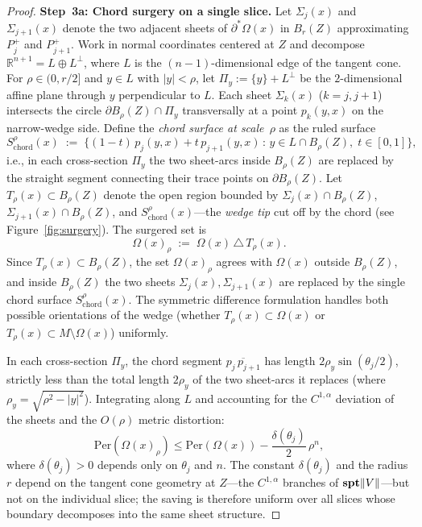 \begin{proof}
\noindent\textbf{Step~3a: Chord surgery on a single slice.}
Let $\Sigma_j(x)$ and $\Sigma_{j+1}(x)$ denote the two adjacent sheets of $\partial^*\Omega(x)$ in $B_r(Z)$ approximating $P_j^+$ and $P_{j+1}^+$. Work in normal coordinates centered at $Z$ and decompose $\mathbb{R}^{n+1} = L \oplus L^\perp$, where $L$ is the $(n-1)$-dimensional edge of the tangent cone. For $\rho \in (0, r/2]$ and $y \in L$ with $|y| < \rho$, let $\Pi_y := \{y\} + L^\perp$ be the $2$-dimensional affine plane through $y$ perpendicular to $L$. Each sheet $\Sigma_k(x)$ ($k = j, j+1$) intersects the circle $\partial B_\rho(Z) \cap \Pi_y$ transversally at a point $p_k(y,x)$ on the narrow-wedge side. Define the \emph{chord surface at scale~$\rho$} as the ruled surface
\[
    S_{\mathrm{chord}}^{\rho}(x) \;:=\; \big\{(1-t)\, p_j(y,x) + t\, p_{j+1}(y,x) \,:\, y \in L \cap B_{\rho}(Z),\; t \in [0,1]\big\},
\]
i.e., in each cross-section $\Pi_y$ the two sheet-arcs inside $B_\rho(Z)$ are replaced by the straight segment connecting their trace points on $\partial B_\rho(Z)$. Let $T_{\rho}(x) \subset B_{\rho}(Z)$ denote the open region bounded by $\Sigma_j(x) \cap B_{\rho}(Z)$, $\Sigma_{j+1}(x) \cap B_{\rho}(Z)$, and $S_{\mathrm{chord}}^{\rho}(x)$---the \emph{wedge tip} cut off by the chord (see Figure~\ref{fig:surgery}). The surgered set is
\[
    \Omega(x)_\rho \;:=\; \Omega(x) \,\triangle\, T_\rho(x).
\]
Since $T_\rho(x) \subset B_\rho(Z)$, the set $\Omega(x)_\rho$ agrees with $\Omega(x)$ outside $B_\rho(Z)$, and inside $B_\rho(Z)$ the two sheets $\Sigma_j(x), \Sigma_{j+1}(x)$ are replaced by the single chord surface $S_{\mathrm{chord}}^{\rho}(x)$. The symmetric difference formulation handles both possible orientations of the wedge (whether $T_\rho(x) \subset \Omega(x)$ or $T_\rho(x) \subset M \setminus \Omega(x)$) uniformly.

In each cross-section $\Pi_y$, the chord segment $\overline{p_j\, p_{j+1}}$ has length $2\rho_y\sin(\theta_j/2)$, strictly less than the total length $2\rho_y$ of the two sheet-arcs it replaces (where $\rho_y = \sqrt{\rho^2 - |y|^2}$). Integrating along $L$ and accounting for the $C^{1,\alpha}$ deviation of the sheets and the $O(\rho)$ metric distortion:
\[
    \mathrm{Per}(\Omega(x)_\rho) \leq \mathrm{Per}(\Omega(x)) - \frac{\delta(\theta_j)}{2}\, \rho^n,
\]
where $\delta(\theta_j) > 0$ depends only on $\theta_j$ and $n$. The constant $\delta(\theta_j)$ and the radius $r$ depend on the tangent cone geometry at $Z$---the $C^{1,\alpha}$ branches of $\mathbf{spt}\|V\|$---but not on the individual slice; the saving is therefore uniform over all slices whose boundary decomposes into the same sheet structure.


\end{proof}

